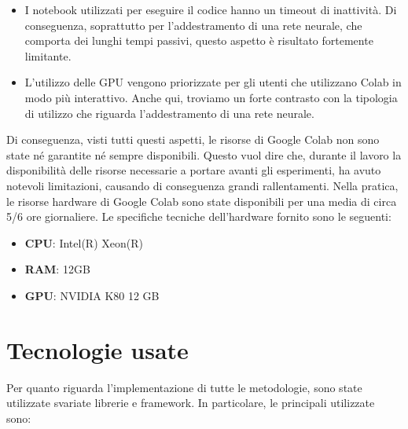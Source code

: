 \begin{itemize}
    \item I notebook utilizzati per eseguire il codice hanno un timeout di inattività. Di conseguenza, soprattutto per l'addestramento di una rete neurale, che comporta dei lunghi tempi passivi, questo aspetto è risultato fortemente limitante.
    
    \item L'utilizzo delle GPU vengono priorizzate per gli utenti che utilizzano Colab in modo più interattivo. Anche qui, troviamo un forte contrasto con la tipologia di utilizzo che riguarda l'addestramento di una rete neurale.
\end{itemize}

Di conseguenza, visti tutti questi aspetti, le risorse di Google Colab non sono state né garantite né sempre disponibili. Questo vuol dire che, durante il lavoro la disponibilità delle risorse necessarie a portare avanti gli esperimenti, ha avuto notevoli limitazioni, causando di conseguenza grandi rallentamenti. Nella pratica, le risorse hardware di Google Colab sono state disponibili per una media di circa 5/6 ore giornaliere.
Le specifiche tecniche dell'hardware fornito sono le seguenti:

\begin{itemize}
    \item  \textbf{CPU}: Intel(R) Xeon(R)
    \item \textbf{RAM}: 12GB
    \item \textbf{GPU}: NVIDIA K80 12 GB
\end{itemize}





\section{Tecnologie usate}
Per quanto riguarda l'implementazione di tutte le metodologie, sono state utilizzate svariate librerie e framework. 
In particolare, le principali utilizzate sono:

